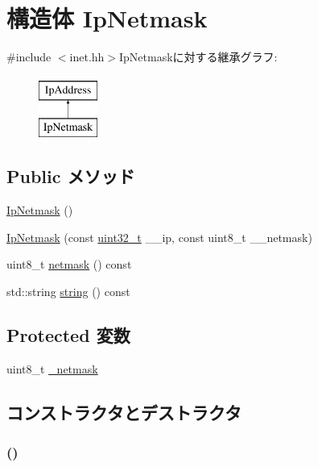 \hypertarget{structNet_1_1IpNetmask}{
\section{構造体 IpNetmask}
\label{structNet_1_1IpNetmask}
}


{\ttfamily \#include $<$inet.hh$>$}IpNetmaskに対する継承グラフ:\begin{figure}[H]
\begin{center}
\leavevmode
\includegraphics[height=2cm]{structNet_1_1IpNetmask}
\end{center}
\end{figure}
\subsection*{Public メソッド}
\begin{DoxyCompactItemize}
\item 
\hyperlink{structNet_1_1IpNetmask_a22d90b95dda2de18df28ed4239cc328f}{IpNetmask} ()
\item 
\hyperlink{structNet_1_1IpNetmask_ac2e215919611af0cd36f6d54848c00b7}{IpNetmask} (const \hyperlink{Type_8hh_a435d1572bf3f880d55459d9805097f62}{uint32\_\-t} \_\-\_\-ip, const uint8\_\-t \_\-\_\-netmask)
\item 
uint8\_\-t \hyperlink{structNet_1_1IpNetmask_ab76fb02ae3d0c5d13e8b01f95df60a7f}{netmask} () const 
\item 
std::string \hyperlink{structNet_1_1IpNetmask_a14a0e4fdb44bd7be64a3c6e5d94f8f0e}{string} () const 
\end{DoxyCompactItemize}
\subsection*{Protected 変数}
\begin{DoxyCompactItemize}
\item 
uint8\_\-t \hyperlink{structNet_1_1IpNetmask_ae0f53299fbdcc8b2714448516f52b618}{\_\-netmask}
\end{DoxyCompactItemize}


\subsection{コンストラクタとデストラクタ}
\hypertarget{structNet_1_1IpNetmask_a22d90b95dda2de18df28ed4239cc328f}{
\subsubsection[{IpNetmask}]{ ()}}
\label{structNet_1_1IpNetmask_a22d90b95dda2de18df28ed4239cc328f}



